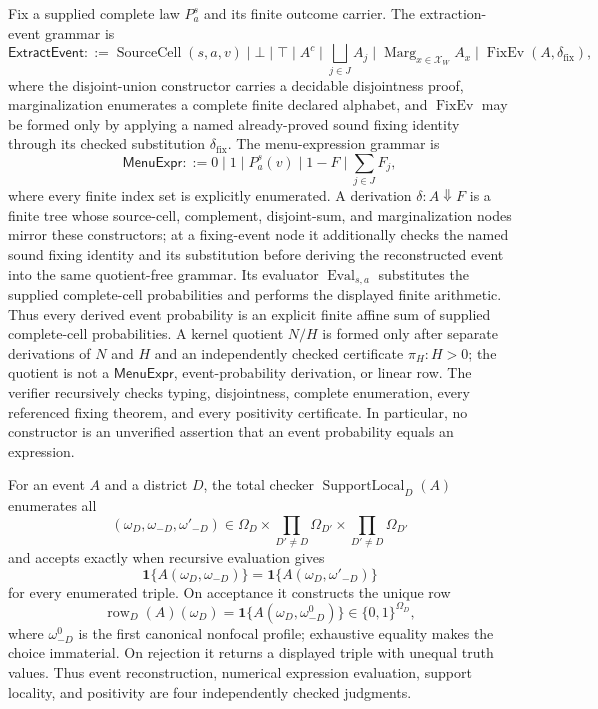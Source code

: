 Fix a supplied complete law \(P_a^s\) and its finite outcome carrier.  The extraction-event grammar is
\[
\mathsf{ExtractEvent}::=\operatorname{SourceCell}(s,a,v)\mid\bot\mid\top\mid A^c\mid\bigsqcup_{j\in J}A_j\mid\operatorname{Marg}_{x\in\mathcal X_W}A_x\mid\operatorname{FixEv}(A,\delta_{\mathrm{fix}}),
\]
where the disjoint-union constructor carries a decidable disjointness proof, marginalization enumerates a complete finite declared alphabet, and \(\operatorname{FixEv}\) may be formed only by applying a named already-proved sound fixing identity through its checked substitution \(\delta_{\mathrm{fix}}\).  The menu-expression grammar is
\[
\mathsf{MenuExpr}::=0\mid1\mid P_a^s(v)\mid 1-F\mid\sum_{j\in J}F_j,
\]
where every finite index set is explicitly enumerated.  A derivation \(\delta:A\Downarrow F\) is a finite tree whose source-cell, complement, disjoint-sum, and marginalization nodes mirror these constructors; at a fixing-event node it additionally checks the named sound fixing identity and its substitution before deriving the reconstructed event into the same quotient-free grammar.  Its evaluator \(\operatorname{Eval}_{s,a}\) substitutes the supplied complete-cell probabilities and performs the displayed finite arithmetic.  Thus every derived event probability is an explicit finite affine sum of supplied complete-cell probabilities.  A kernel quotient \(N/H\) is formed only after separate derivations of \(N\) and \(H\) and an independently checked certificate \(\pi_H:H>0\); the quotient is not a \(\mathsf{MenuExpr}\), event-probability derivation, or linear row.  The verifier recursively checks typing, disjointness, complete enumeration, every referenced fixing theorem, and every positivity certificate.  In particular, no constructor is an unverified assertion that an event probability equals an expression.

For an event \(A\) and a district \(D\), the total checker \(\operatorname{SupportLocal}_D(A)\) enumerates all
\[
(\omega_D,\omega_{-D},\omega'_{-D})\in
\Omega_D\times\prod_{D'\ne D}\Omega_{D'}\times\prod_{D'\ne D}\Omega_{D'}
\]
and accepts exactly when recursive evaluation gives
\[
\mathbf 1\{A(\omega_D,\omega_{-D})\}
=\mathbf 1\{A(\omega_D,\omega'_{-D})\}
\]
for every enumerated triple.  On acceptance it constructs the unique row
\[
\operatorname{row}_D(A)(\omega_D)
=\mathbf 1\{A(\omega_D,\omega_{-D}^0)\}\in\{0,1\}^{\Omega_D},
\]
where \(\omega_{-D}^0\) is the first canonical nonfocal profile; exhaustive equality makes the choice immaterial.  On rejection it returns a displayed triple with unequal truth values.  Thus event reconstruction, numerical expression evaluation, support locality, and positivity are four independently checked judgments.